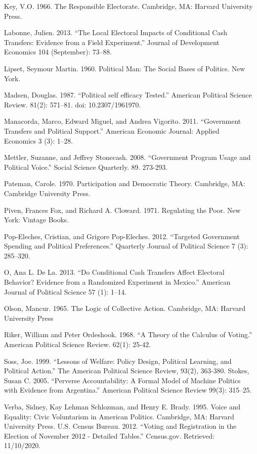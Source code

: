 \documentclass[12pt]{paper}
\begin{document}
\begin{hangparas}{.25in}{1}
Key, V.O. 1966. The Responsible Electorate. Cambridge, MA: Harvard University Press.


Labonne, Julien. 2013. “The Local Electoral Impacts of Conditional Cash Transfers: Evidence from a Field Experiment.” Journal of Development Economics 104 (September): 73–88.


Lipset, Seymour Martin. 1960. Political Man: The Social Bases of Politics. New York. 


Madsen, Douglas. 1987. “Political self efficacy Tested.” American Political Science Review. 81(2): 571–81. doi: 10.2307/1961970.


Manacorda, Marco, Edward Miguel, and Andrea Vigorito. 2011. “Government Transfers and Political Support.” American Economic Journal: Applied Economics 3 (3): 1–28.


Mettler, Suzanne, and Jeffrey Stonecash. 2008. “Government Program Usage and Political Voice.” Social Science Quarterly. 89. 273-293. 


Pateman, Carole. 1970. Participation and Democratic Theory. Cambridge, MA: Cambridge University Press.


Piven, Frances Fox, and Richard A. Cloward. 1971. Regulating the Poor. New York: Vintage Books.


Pop-Eleches, Cristian, and Grigore Pop-Eleches. 2012. “Targeted Government Spending and Political Preferences.” Quarterly Journal of Political Science 7 (3): 285–320.


O, Ana L. De La. 2013. “Do Conditional Cash Transfers Affect Electoral Behavior? Evidence from a Randomized Experiment in Mexico.” American Journal of Political Science 57 (1): 1–14.


Olson, Mancur. 1965. The Logic of Collective Action. Cambridge, MA: Harvard University Press


Riker, William and Peter Ordeshook. 1968. “A Theory of the Calculus of Voting.” American Political Science Review. 62(1): 25-42.


Soss, Joe. 1999. “Lessons of Welfare: Policy Design, Political Learning, and Political Action.” The American Political Science Review, 93(2), 363-380.
Stokes, Susan C. 2005. “Perverse Accountability: A Formal Model of Machine Politics with Evidence from Argentina.” American Political Science Review 99(3): 315–25.


Verba, Sidney, Kay Lehman Schlozman, and Henry E. Brady. 1995. Voice and Equality: Civic Voluntarism in American Politics. Cambridge, MA: Harvard University Press.
U.S. Census Bureau. 2012. “Voting and Registration in the Election of November 2012 - Detailed Tables.” Census.gov. Retrieved: 11/10/2020.
\end{hangparas}
\clearpage
\end{document}

